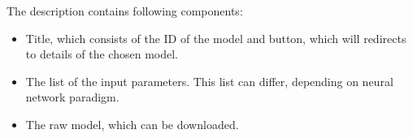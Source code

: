 \begin{itemize}
The description contains following components:
\begin{itemize}
\item Title, which consists of the ID of the model and button, which will redirects to details of the chosen model.
\item The list of the input parameters. This list can differ, depending on neural network paradigm. 
\item The raw model, which can be downloaded. 
\end{itemize}

\end{itemize}
